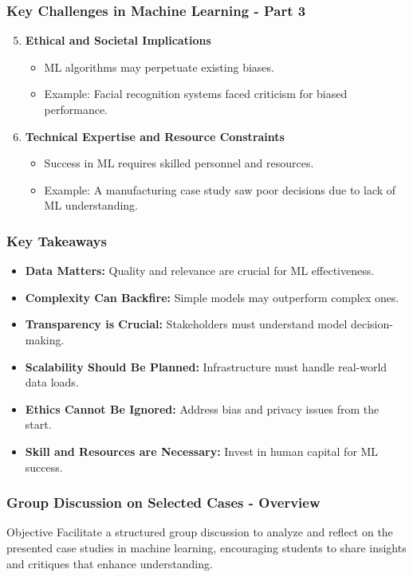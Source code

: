 \documentclass[aspectratio=169]{beamer}
\begin{document}
\begin{frame}[fragile]
    \frametitle{Key Challenges in Machine Learning - Part 3}
    \begin{enumerate}
        \setcounter{enumi}{4}
        \item \textbf{Ethical and Societal Implications}
            \begin{itemize}
                \item ML algorithms may perpetuate existing biases.
                \item Example: Facial recognition systems faced criticism for biased performance.
            \end{itemize}
        \item \textbf{Technical Expertise and Resource Constraints}
            \begin{itemize}
                \item Success in ML requires skilled personnel and resources.
                \item Example: A manufacturing case study saw poor decisions due to lack of ML understanding.
            \end{itemize}
    \end{enumerate}
\end{frame}

\begin{frame}[fragile]
    \frametitle{Key Takeaways}
    \begin{itemize}
        \item \textbf{Data Matters:} Quality and relevance are crucial for ML effectiveness.
        \item \textbf{Complexity Can Backfire:} Simple models may outperform complex ones.
        \item \textbf{Transparency is Crucial:} Stakeholders must understand model decision-making.
        \item \textbf{Scalability Should Be Planned:} Infrastructure must handle real-world data loads.
        \item \textbf{Ethics Cannot Be Ignored:} Address bias and privacy issues from the start.
        \item \textbf{Skill and Resources are Necessary:} Invest in human capital for ML success.
    \end{itemize}
\end{frame}

\begin{frame}[fragile]
    \frametitle{Group Discussion on Selected Cases - Overview}
    \begin{block}{Objective}
        Facilitate a structured group discussion to analyze and reflect on the presented case studies in machine learning, encouraging students to share insights and critiques that enhance understanding.
    \end{block}
\end{frame}
\end{document}
